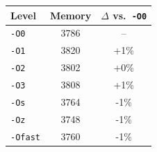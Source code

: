\begin{tabular*}{\columnwidth}{@{\extracolsep\fill}lcc@{\extracolsep\fill}}
\toprule
\textbf{Level} & \textbf{Memory} & \textbf{$\Delta$ vs.\ \texttt{-O0}} \\
\midrule
\texttt{-O0} & 3786 & -- \\
\texttt{-O1} & 3820 & +1\% \\
\texttt{-O2} & 3802 & +0\% \\
\texttt{-O3} & 3808 & +1\% \\
\texttt{-Os} & 3764 & -1\% \\
\texttt{-Oz} & 3748 & -1\% \\
\texttt{-Ofast} & 3760 & -1\% \\
\bottomrule
\end{tabular*}
